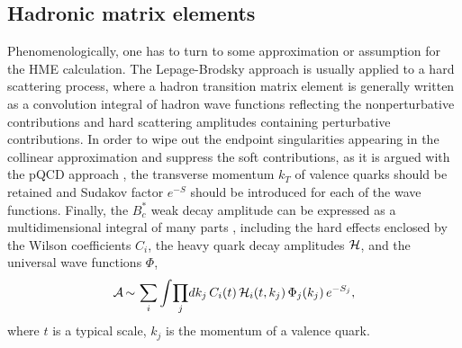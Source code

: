 \documentclass[preprint,superscriptaddress,nofootinbib]{revtex4}
\begin{document}
  \subsection{Hadronic matrix elements}
  \label{sec0202}
  Phenomenologically, one has to turn to some approximation or
  assumption for the HME calculation.
  The Lepage-Brodsky approach \cite{prd22} is usually applied
  to a hard scattering process, where a hadron transition matrix
  element is generally written as a convolution integral of
  hadron wave functions reflecting the nonperturbative
  contributions and hard scattering amplitudes containing
  perturbative contributions.
  In order to wipe out the endpoint singularities appearing in
  the collinear approximation \cite{qcdf1,qcdf2,qcdf3} and
  suppress the soft contributions, as it is argued with the pQCD
  approach \cite{pqcd1,pqcd2,pqcd3}, the transverse momentum
  $k_{T}$ of valence quarks should be retained and Sudakov
  factor $e^{-S}$ should be introduced for each of the wave functions.
  Finally, the $B_{c}^{\ast}$ weak decay amplitude can be expressed
  as a multidimensional integral of many parts \cite{pqcd2,pqcd3},
  including the hard effects enclosed by the Wilson coefficients
  $C_{i}$, the heavy quark decay amplitudes ${\cal H}$, and
  the universal wave functions ${\Phi}$,
  \begin{equation}
 {\cal A}\, {\sim}\,
  \sum_{i} {\int} {\prod_j}dk_{j}\,
  C_{i}(t)\,{\cal H}_{i}(t,k_{j})\,{\Phi}_{j}(k_{j})\,e^{-S_{j}}
  \label{hadronic},
  \end{equation}
  where $t$ is a typical scale, $k_{j}$ is the momentum of a valence
  quark.

\end{document}
